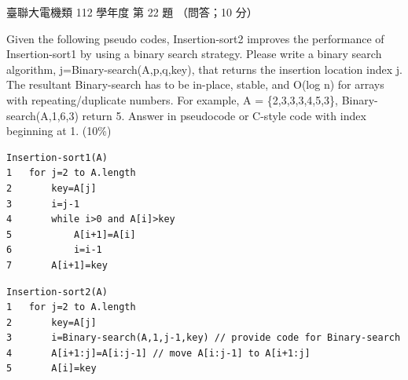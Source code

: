 \begin{pastexam}[label={px:ust-112-ee-ds-22}]{臺聯大電機類 112 學年度 第 22 題}
（問答；10 分）

Given the following pseudo codes, Insertion-sort2 improves the performance of Insertion-sort1 by
using a binary search strategy. Please write a binary search algorithm,
j=Binary-search(A,p,q,key), that returns the insertion location index j. The resultant
Binary-search has to be in-place, stable, and O(log n) for arrays with repeating/duplicate numbers.
For example, A = \{2,3,3,3,4,5,3\}, Binary-search(A,1,6,3) return 5. Answer in pseudocode or
C-style code with index beginning at 1. (10\%)
\begin{lstlisting}[basicstyle=\ttfamily\small, frame=single, columns=fullflexible,
    keepspaces=true, xleftmargin=5em, xrightmargin=5em]
Insertion-sort1(A)
1   for j=2 to A.length
2       key=A[j]
3       i=j-1
4       while i>0 and A[i]>key
5           A[i+1]=A[i]
6           i=i-1
7       A[i+1]=key
\end{lstlisting}
\begin{lstlisting}[basicstyle=\ttfamily\small, frame=single, columns=fullflexible,
    keepspaces=true, xleftmargin=1em, xrightmargin=1em]
Insertion-sort2(A)
1   for j=2 to A.length
2       key=A[j]
3       i=Binary-search(A,1,j-1,key) // provide code for Binary-search
4       A[i+1:j]=A[i:j-1] // move A[i:j-1] to A[i+1:j]
5       A[i]=key
\end{lstlisting}
\end{pastexam}

